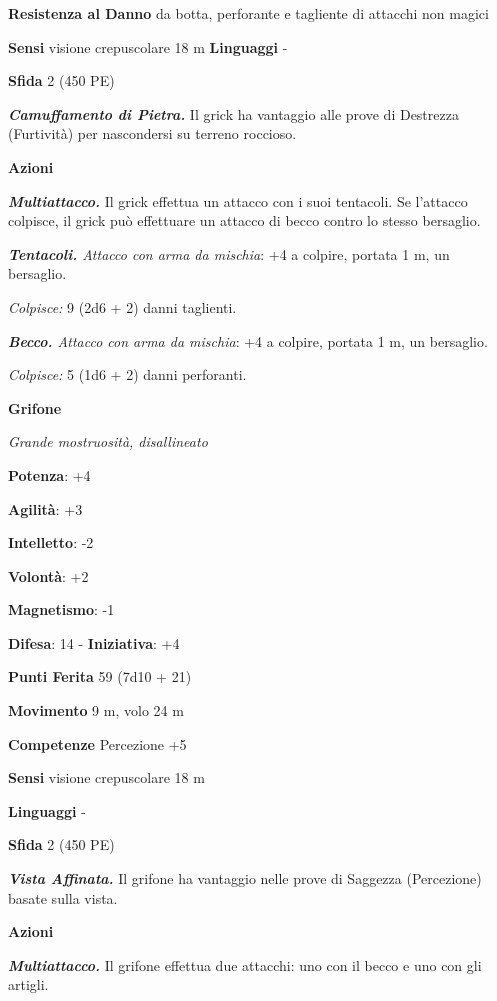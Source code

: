 \begin{multicols}{2}
\textbf{Resistenza al Danno} da botta, perforante e tagliente di
attacchi non magici

\textbf{Sensi} visione crepuscolare 18 m
\textbf{Linguaggi} -

\textbf{Sfida} 2 (450 PE)\smallskip

\emph{\textbf{Camuffamento di Pietra.}} Il grick ha vantaggio alle prove
di Destrezza (Furtività) per nascondersi su terreno roccioso.

\smallskip\textbf{Azioni}

\emph{\textbf{Multiattacco.}} Il grick effettua un attacco con i suoi
tentacoli. Se l'attacco colpisce, il grick può effettuare un attacco di
becco contro lo stesso bersaglio.

\emph{\textbf{Tentacoli.} Attacco con arma da mischia}: +4 a colpire,
portata 1 m, un bersaglio.

\emph{Colpisce:} 9 (2d6 + 2) danni taglienti.

\emph{\textbf{Becco.} Attacco con arma da mischia}: +4 a colpire,
portata 1 m, un bersaglio.

\emph{Colpisce:} 5 (1d6 + 2) danni perforanti.



\textbf{Grifone}

\emph{Grande mostruosità, disallineato}

\textbf{Potenza}: +4

\textbf{Agilità}: +3

\textbf{Intelletto}: -2

\textbf{Volontà}: +2

\textbf{Magnetismo}: -1

\textbf{Difesa}: 14 - \textbf{Iniziativa}: +4

\textbf{Punti Ferita} 59 (7d10 + 21)

\textbf{Movimento} 9 m, volo 24 m

\textbf{Competenze} Percezione +5

\textbf{Sensi} visione crepuscolare 18 m

\textbf{Linguaggi} -

\textbf{Sfida} 2 (450 PE)\smallskip

\emph{\textbf{Vista Affinata.}} Il grifone ha vantaggio nelle prove di
Saggezza (Percezione) basate sulla vista.

\smallskip\textbf{Azioni}

\emph{\textbf{Multiattacco.}} Il grifone effettua due attacchi: uno con
il becco e uno con gli artigli.


\end{multicols}

